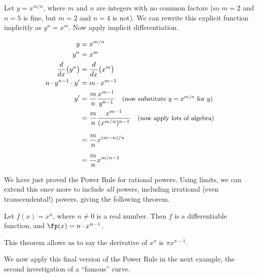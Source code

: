 Let $y = x^{m/n}$, where $m$ and $n$ are integers with no common factors (so $m=2$ and $n=5$ is fine, but $m=2$ and $n=4$ is not). We can rewrite this explicit function implicitly as $y^n = x^m$. Now apply implicit differentiation.

\begin{align*}
y &= x^{m/n} \\
y^n &= x^m \\
\frac{d}{dx}\big(y^n\big) &= \frac{d}{dx}\big(x^m\big) \\
n\cdot y^{n-1}\cdot y' &= m\cdot x^{m-1} \\
y' 	&= \frac{m}{n} \frac{x^{m-1}}{y^{n-1}} \quad \mbox{\small (now substitute $y=x^{m/n}$ for $y$)} \\
 		&= \frac{m}{n} \frac{x^{m-1}}{(x^{m/n})^{n-1}} \quad \mbox{\small (now apply lots of algebra)}\\
		&= \frac{m}n x^{(m-n)/n}\rule{0pt}{18pt}\\
		&= \frac{m}n x^{m/n -1}\rule{0pt}{18pt}
\end{align*}

We have just proved the Power Rule for rational powers. Using limits, we can extend this once more to include \textit{all} powers, including irrational (even transcendental!) powers, giving the following theorem.

{Let $f(x) = x^n$, where $n\neq 0$ is a real number. Then $f$ is a differentiable function, and $\fp(x) = n\cdot x^{n-1}$.
}

This theorem allows us to say the derivative of $x^\pi$ is $\pi x^{\pi -1}$. 

We now apply this final version of the Power Rule in the next example, the second investigation of a ``famous'' curve.\\

